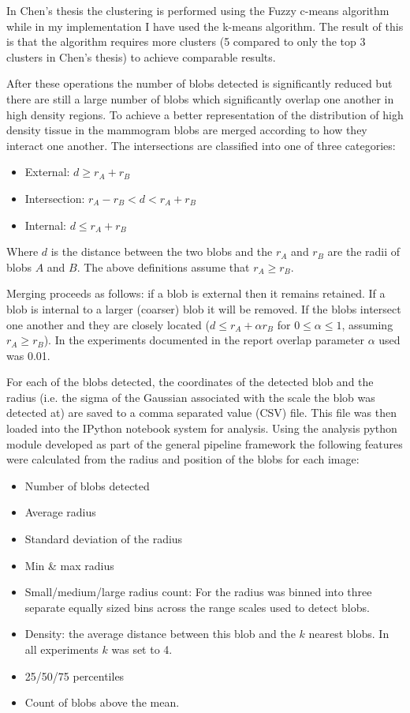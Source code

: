 In Chen's thesis the clustering is performed using the Fuzzy c-means algorithm while in my implementation I have used the k-means algorithm. The result of this is that the algorithm requires more clusters (5 compared to only the top 3 clusters in Chen's thesis) to achieve comparable results.

After these operations the number of blobs detected is significantly reduced but there are still a large number of blobs which significantly overlap one another in high density regions. To achieve a better representation of the distribution of high density tissue in the mammogram blobs are merged according to how they interact one another. The intersections are classified into one of three categories:

\begin{itemize}
	\item External: $d \geq r_A + r_B$
	\item Intersection: $r_A - r_B < d < r_A + r_B$
	\item Internal: $d \leq r_A + r_B$
\end{itemize}

Where $d$ is the distance between the two blobs and the $r_A$ and $r_B$ are the radii of blobs $A$ and $B$. The above definitions assume that $r_A \geq r_B$.

Merging proceeds as follows: if a blob is external then it remains retained. If a blob is internal to a larger (coarser) blob it will be removed. If the blobs intersect one another and they are closely located ($d \leq r_A + \alpha r_B$ for $0 \leq \alpha \leq 1$, assuming $r_A \geq r_B$). In the experiments documented in the report overlap parameter $\alpha$ used was 0.01. 

For each of the blobs detected, the coordinates of the detected blob and the radius (i.e. the sigma of the Gaussian associated with the scale the blob was detected at) are saved to a comma separated value (CSV) file. This file was then loaded into the IPython notebook system for analysis. Using the analysis python module developed as part of the general pipeline framework the following features were calculated from the radius and position of the blobs for each image:

\begin{itemize}
	\item Number of blobs detected
	\item Average radius
	\item Standard deviation of the radius
	\item Min \& max radius
	\item Small/medium/large radius count: For the radius was binned into three separate equally sized bins across the range scales used to detect blobs.
	\item Density: the average distance between this blob and the $k$ nearest blobs. In all experiments $k$ was set to 4.
	\item 25/50/75 percentiles
	\item Count of blobs above the mean.
\end{itemize}


